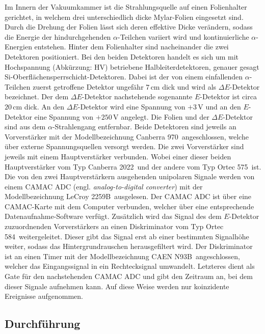 Im Innern der Vakuumkammer ist die Strahlungsquelle auf einen Folienhalter gerichtet, in welchem drei unterschiedlich dicke Mylar-Folien eingesetzt sind.
Durch die Drehung der Folien lässt sich deren effektive Dicke verändern, sodass die Energie der hindurchgehenden $\alpha$-Teilchen variiert wird und kontinuierliche $\alpha$-Energien entstehen.
Hinter dem Folienhalter sind nacheinander die zwei Detektoren positioniert.
Bei den beiden Detektoren handelt es sich um mit Hochspannung (Abkürzung: HV) betriebene Halbleiterdetektoren, genauer gesagt Si-Oberflächensperrschicht-Detektoren.
Dabei ist der von einem einfallenden $\alpha$-Teilchen zuerst getroffene Detektor ungefähr $7\,$cm dick und wird als $\Delta E$-Detektor bezeichnet.
Der dem $\Delta E$-Detektor nachstehende sogenannte $E$-Detektor ist circa $20\,$cm dick.
An den $\Delta E$-Detektor wird eine Spannung von $+3\,$V und an den $E$-Detektor eine Spannung von $+250\,$V angelegt.
Die Folien und der $\Delta E$-Detektor sind aus dem $\alpha$-Strahlengang entfernbar.
Beide Detektoren sind jeweils an Vorverstärker mit der Modellbezeichnung \glqq Canberra 970\grqq\ angeschlossen, welche über externe Spannungsquellen versorgt werden.
Die zwei Vorverstärker sind jeweils mit einem Hauptverstärker verbunden.
Wobei einer dieser beiden Hauptverstärker vom Typ \glqq Canberra 2022\grqq\ und der andere vom Typ \glqq Ortec 575\grqq\ ist.
Die von den zwei Hauptverstärkern ausgehenden unipolaren Signale werden von einem CAMAC ADC (engl. \emph{analog-to-digital converter}) mit der Modellbezeichnung \glqq LeCroy 2259B\grqq\ ausgelesen.
Der CAMAC ADC ist über eine CAMAC-Karte mit dem Computer verbunden, welcher über eine entsprechende Datenaufnahme-Software verfügt.
Zusätzlich wird das Signal des dem $E$-Detektor zuzuordnenden Vorverstärkers an einen Diskriminator vom Typ \glqq Ortec 584\grqq\ weitergeleitet.
Dieser gibt das Signal erst ab einer bestimmten Signalhöhe weiter, sodass das Hintergrundrauschen herausgefiltert wird.
Der Diskriminator ist an einen Timer mit der Modellbezeichnung \glqq CAEN N93B\grqq\ angeschlossen, welcher das Eingangssignal in ein Rechtecksignal umwandelt.
Letzteres dient als Gate für den nachstehenden CAMAC ADC und gibt den Zeitraum an, bei dem dieser Signale aufnehmen kann.
Auf diese Weise werden nur koinzidente Ereignisse aufgenommen.



\subsection{Durchführung}

